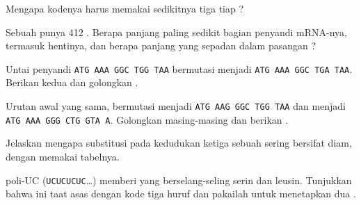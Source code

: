 \begin{exercise}[$\star$]\label{exo:g11:gene-expression:5}
Mengapa kodenya harus memakai sedikitnya tiga  tiap ?
\end{exercise}

\begin{exercise}[$\star\star$]\label{exo:g11:gene-expression:6}
Sebuah  punya 412 . Berapa panjang paling sedikit
bagian penyandi mRNA-nya, termasuk  hentinya, dan berapa panjang
 yang sepadan dalam pasangan ?
\end{exercise}

\begin{exercise}[$\star\star$]\label{exo:g11:gene-expression:7}
Untai penyandi \texttt{ATG AAA GGC TGG TAA} bermutasi menjadi
\texttt{ATG AAA GGC TGA TAA}. Berikan kedua  dan golongkan
.
\end{exercise}

\begin{exercise}[$\star\star$]\label{exo:g11:gene-expression:8}
Urutan awal yang sama, bermutasi menjadi \texttt{ATG AAG GGC TGG TAA}
dan menjadi \texttt{ATG AAA GGG CTG GTA A}. Golongkan masing-masing dan
berikan .
\end{exercise}

\begin{exercise}[$\star\star$]\label{exo:g11:gene-expression:9}
Jelaskan mengapa substitusi pada kedudukan ketiga sebuah  sering
bersifat diam, dengan memakai tabelnya.
\end{exercise}

\begin{exercise}[$\star\star$]\label{exo:g11:gene-expression:10}
 poli-UC (\texttt{UCUCUCUC}\dots) memberi  yang berselang-seling
serin dan leusin. Tunjukkan bahwa ini taat asas dengan kode tiga huruf
dan pakailah untuk menetapkan dua .
\end{exercise}

